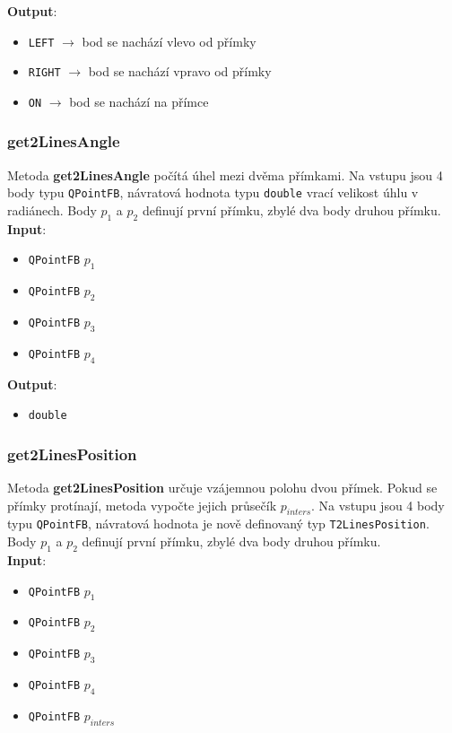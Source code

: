 \documentclass[a4paper, 12pt]{article}
\begin{document}
\textbf{Output}:
\begin{itemize}
\item \texttt{LEFT} $\rightarrow$ bod se nachází vlevo od přímky
\item \texttt{RIGHT} $\rightarrow$ bod se nachází vpravo od přímky
\item \texttt{ON} $\rightarrow$ bod se nachází na přímce
\end{itemize}

\subsubsection*{get2LinesAngle}
Metoda \textbf{get2LinesAngle} počítá úhel mezi dvěma přímkami. Na vstupu jsou 4 body typu \texttt{QPointFB}, návratová hodnota typu \texttt{double} vrací velikost úhlu v radiánech. Body $p_1$ a $p_2$ definují první přímku, zbylé dva body druhou přímku.\\

\textbf{Input}:
\begin{itemize}
\item \texttt{QPointFB} $p_1$ 
\item \texttt{QPointFB} $p_2$ 
\item \texttt{QPointFB} $p_3$
\item \texttt{QPointFB} $p_4$
\end{itemize}

\textbf{Output}:
\begin{itemize}
\item \texttt{double} 
\end{itemize}

\subsubsection*{get2LinesPosition}
Metoda \textbf{get2LinesPosition} určuje vzájemnou polohu dvou přímek. Pokud se přímky protínají, metoda vypočte jejich průsečík $p_{inters}$. Na vstupu jsou 4 body typu \texttt{QPointFB}, návratová hodnota je nově definovaný typ \texttt{T2LinesPosition}. Body $p_1$ a $p_2$ definují první přímku, zbylé dva body druhou přímku.\\

\textbf{Input}:
\begin{itemize}
\item \texttt{QPointFB} $p_1$ 
\item \texttt{QPointFB} $p_2$ 
\item \texttt{QPointFB} $p_3$
\item \texttt{QPointFB} $p_4$
\item \texttt{QPointFB} $p_{inters}$
\end{itemize}
\end{document}
